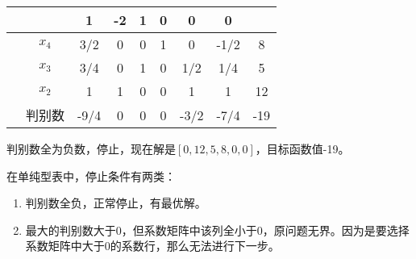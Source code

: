 \begin{solution}
\begin{longtable}{c|c|cccccc|c}
	 &       &   1   &  -2   &   1   &   0   &   0   &   0   &    \\ \hline
	 & $x_4$ &  3/2  &   0   &   0   &   1   &   0   & -1/2  & 8  \\
	 & $x_3$ &  3/4  &   0   &   1   &   0   &   1/2   &  1/4  & 5 \\
	 & $x_2$ &   1   &   1   &   0   &   0   &   1   &  1  & 12  \\ \hline
	 &  判别数  &   -9/4   &   0   &   0   &   0   &   -3/2   &  -7/4   & -19
\end{longtable}
判别数全为负数，停止，现在解是$[0, 12, 5, 8, 0, 0]$，目标函数值-19。

在单纯型表中，停止条件有两类：
\begin{enumerate}
\item 判别数全负，正常停止，有最优解。
\item 最大的判别数大于0，但系数矩阵中该列全小于0，原问题无界。因为是要选择系数矩阵中大于0的系数行，那么无法进行下一步。
\end{enumerate}

\end{solution}

